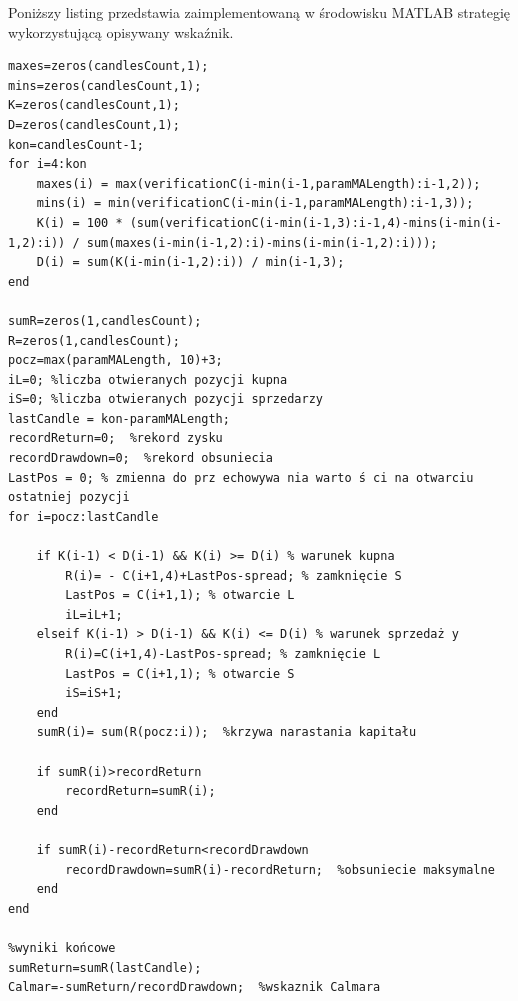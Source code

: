 \noindent Poniższy listing przedstawia zaimplementowaną w środowisku MATLAB strategię wykorzystującą opisywany wskaźnik.
\begin{scriptsize}
\begin{lstlisting}
maxes=zeros(candlesCount,1);
mins=zeros(candlesCount,1);
K=zeros(candlesCount,1);
D=zeros(candlesCount,1);
kon=candlesCount-1;
for i=4:kon
    maxes(i) = max(verificationC(i-min(i-1,paramMALength):i-1,2));
    mins(i) = min(verificationC(i-min(i-1,paramMALength):i-1,3));
    K(i) = 100 * (sum(verificationC(i-min(i-1,3):i-1,4)-mins(i-min(i-1,2):i)) / sum(maxes(i-min(i-1,2):i)-mins(i-min(i-1,2):i)));
    D(i) = sum(K(i-min(i-1,2):i)) / min(i-1,3);
end

sumR=zeros(1,candlesCount);
R=zeros(1,candlesCount);
pocz=max(paramMALength, 10)+3;
iL=0; %liczba otwieranych pozycji kupna
iS=0; %liczba otwieranych pozycji sprzedarzy
lastCandle = kon-paramMALength;
recordReturn=0;  %rekord zysku
recordDrawdown=0;  %rekord obsuniecia
LastPos = 0; % zmienna do prz echowywa nia warto ś ci na otwarciu ostatniej pozycji
for i=pocz:lastCandle
    
    if K(i-1) < D(i-1) && K(i) >= D(i) % warunek kupna
        R(i)= - C(i+1,4)+LastPos-spread; % zamknięcie S
        LastPos = C(i+1,1); % otwarcie L
        iL=iL+1;
    elseif K(i-1) > D(i-1) && K(i) <= D(i) % warunek sprzedaż y
        R(i)=C(i+1,4)-LastPos-spread; % zamknięcie L
        LastPos = C(i+1,1); % otwarcie S
        iS=iS+1;
    end
    sumR(i)= sum(R(pocz:i));  %krzywa narastania kapitału
    
    if sumR(i)>recordReturn
        recordReturn=sumR(i);
    end
    
    if sumR(i)-recordReturn<recordDrawdown
        recordDrawdown=sumR(i)-recordReturn;  %obsuniecie maksymalne
    end
end

%wyniki końcowe
sumReturn=sumR(lastCandle);
Calmar=-sumReturn/recordDrawdown;  %wskaznik Calmara
\end{lstlisting}
\end{scriptsize}


